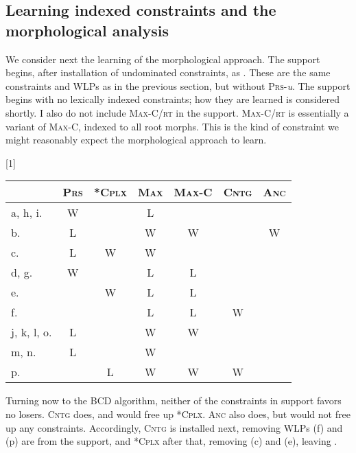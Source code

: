 \documentclass[output=paper,
modfonts
]{LSP/langsci}
\begin{document}
\subsection[Learning indexed constraints and the morphological analysis]{Learning indexed constraints and the morphological analysis}\label{sec:round:5.4}
\label{bkm:Ref335251071}
We consider next the learning of the morphological approach. The support begins, after installation of undominated constraints, as . These are the same constraints and WLPs as in the previous section, but without \textsc{Prs}{}-\textit{u}. The support begins with no lexically indexed constraints; how they are learned is considered shortly. I also do not include \textsc{Max-C/rt} in the support. \textsc{Max-C/rt} is essentially a variant of \textsc{Max-C,} indexed to all root morphs. This is the kind of constraint we might reasonably expect the morphological approach to learn.

\ea \label{ex:round:35} 
\renewcommand*\arraystretch{1.2}
\scalebox{1}[1]{\begin{tabular}[t]{|l||c|c||c|c|c|c|}
\firsthline & \textsc{Prs} & \textsc{*Cplx} & \textsc{Max} & \textsc{Max-C} &  \textsc{Cntg} &  \textsc{Anc} \\
\hline
\hline a, h, i. & W & & L & & & \\
\hline b. & L & & W & W & & W \\
\hline c. & L & W & W & & & \\
\hline d, g. & W & & L & L & & \\
\hline e. & & W & L & L & & \\
\hline f. & & & L & L & W & \\
\hline j, k, l, o. & L & & W & W & & \\
\hline m, n. & L & & W & & & \\
\hline p. & & L & W & W & W & \\
\hline \end{tabular}} \renewcommand*\arraystretch{1}
\z

Turning now to the BCD algorithm, neither of the  constraints in support  favors no losers. \textsc{Cntg} does, and would free up *\textsc{Cplx}. \textsc{Anc} also does, but would not free up any  constraints. Accordingly, \textsc{Cntg} is installed next, removing WLPs (f) and (p) are from the support, and *\textsc{Cplx} after that, removing (c) and (e), leaving .
\end{document}

